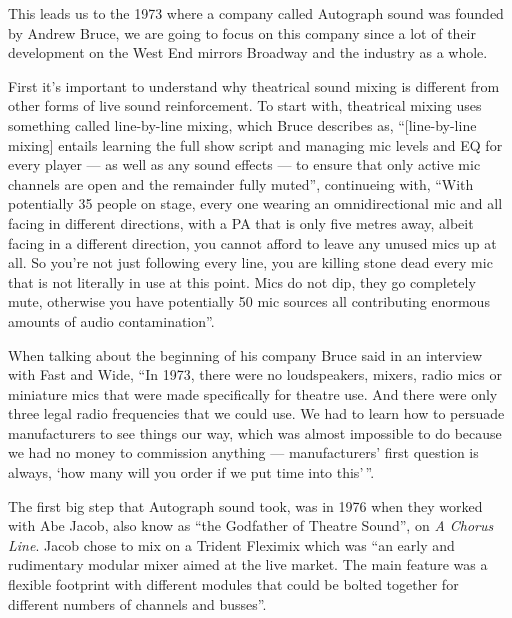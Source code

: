 \documentclass[12pt]{article}
\begin{document}
\begin{doublespace}
\par This leads us to the 1973 where a company called Autograph sound was founded by Andrew Bruce, we are going to focus on this company since a lot of their development on the West End mirrors Broadway and the industry as a whole.
\par First it's important to understand why theatrical sound mixing is different from other forms of live sound reinforcement.
To start with, theatrical mixing uses something called line-by-line mixing, which Bruce describes as, ``[line-by-line mixing] entails learning the full show script and managing mic levels and EQ for every player — as well as any sound effects — to ensure that only active mic channels are open and the remainder fully muted''\autocite{bruceAndrewBruceMusical}, continueing with, ``With potentially 35 people on stage, every one wearing an omnidirectional mic and all facing in different directions, with a PA that is only five metres away, albeit facing in a different direction, you cannot afford to leave any unused mics up at all. So you're not just following
every line, you are killing stone dead every mic that is not literally in use at this point. Mics do not dip, they go completely mute, otherwise you have potentially 50 mic sources all contributing enormous amounts of audio contamination''.\autocite{bruceAndrewBruceMusical}
\par When talking about the beginning of his company Bruce said in an interview with Fast and Wide, ``In 1973, there were no loudspeakers, mixers, radio mics or miniature mics that were made specifically for theatre use. And there were only three legal radio frequencies that we could use. We had to learn how to persuade manufacturers to see things our way, which was almost impossible to do because we had no money to commission anything --- manufacturers' first question is always, `how many will you order if we put time into this'\,''.\autocite{bruceTheatreSoundDigital}
\par The first big step that Autograph sound took, was in 1976 when they worked with Abe Jacob, also know as ``the Godfather of Theatre Sound'', on \textit{A Chorus Line}. Jacob chose to mix on a Trident Fleximix which was ``an early and rudimentary modular mixer aimed at the live market. The main feature was a flexible footprint with different modules that could be bolted together for different numbers of channels and busses''.\autocite{bruceTheatreSoundDigital}

\end{doublespace}
\end{document}
